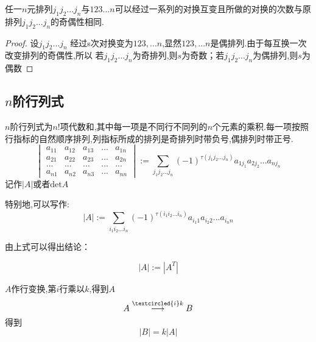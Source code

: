 \documentclass[blue,normal,cn]{elegantnote}
\begin{document}
\begin{theorem}
任一$n$元排列$j_1j_2...j_n$与$123...n$可以经过一系列的对换互变且所做的对换的次数与原排列$j_1j_2...j_n$的奇偶性相同.
\end{theorem}
\begin{proof}
设$j_1j_2...j_n$ 经过s次对换变为$123,...n$,显然$123,...n$是偶排列.由于每互换一次改变排列的奇偶性,所以
若$j_1j_2...j_n$为奇排列,则$s$为奇数；若$j_1j_2...j_n$为偶排列,则$s$为偶数
\end{proof}


\subsection{$n$阶行列式}

\begin{definition}[$n$阶行列式]
$n$阶行列式为$n!$项代数和,其中每一项是不同行不同列的$n$个元素的乘积.每一项按照行指标的自然顺序排列,列指标所成的排列是奇排列时带负号,偶排列时带正号.
\begin{equation*}
\begin{vmatrix} 
    a_{11}&a_{12} & a_{13} &...& a_{1n}\\
    a_{21}&a_{22} & a_{23} &...& a_{2n}\\
    ...&...&...&...&...\\
    a_{n1}&a_{n2} & a_{n3} &...& a_{nn}
\end{vmatrix}
:=\sum_{j_1j_2...j_n}(-1)^{\tau(j_1j_2...j_n)}a_{1j_1}a_{2j_2}...a_{nj_n}
\end{equation*}
记作$|A|$或者$\mathrm {det}A$
\end{definition}

特别地,可以写作:
\begin{equation*}
|A|:=\sum_{i_1i_2...i_n}(-1)^{\tau(i_1 i_2...i_n)}a_{i_1 1}a_{i_2 2}...a_{i_n n}
\end{equation*}

由上式可以得出结论：
\begin{property}
\begin{equation*}
    |A|:=|A^T|
\end{equation*}
\end{property}

\begin{property}
$A$作行变换,第$i$行乘以$k$,得到$A$
    \begin{equation*}
        A\stackrel{\textcircled{i}k}{\longrightarrow}B
    \end{equation*}
得到
    \begin{equation*}
        |B|=k|A|
    \end{equation*}
\end{property}
\end{document}
